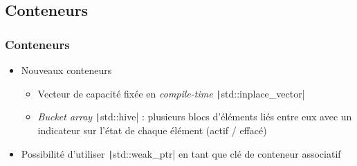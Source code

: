 \documentclass[C++.tex]{subfiles}
\begin{document}
\subsection*{Conteneurs}
\begin{frame}[fragile]
	\frametitle{Conteneurs}
	\begin{itemize}
		\item Nouveaux conteneurs
		\begin{itemize}
			\item Vecteur de capacité fixée en \textit{compile-time} \texttt|std::inplace_vector|


			\item \textit{Bucket array} \texttt|std::hive| : plusieurs blocs d'éléments liés entre eux avec un indicateur sur l'état de chaque élément (actif / effacé)

		\end{itemize}
		\item Possibilité d'utiliser \texttt|std::weak_ptr| en tant que clé de conteneur associatif
	\end{itemize}

\end{frame}
\end{document}

